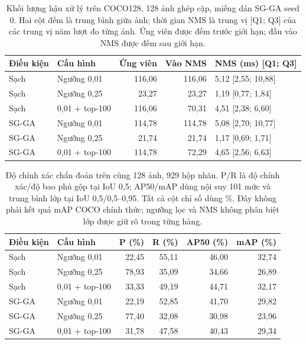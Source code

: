 \documentclass[a4paper,fleqn]{cas-dc}
\begin{document}
\begin{table}[t]
\centering
\small
\caption{Khối lượng hậu xử lý trên COCO128, 128 ảnh ghép cặp, miếng dán SG-GA seed 0. Hai cột đếm là trung bình giữa ảnh; thời gian NMS là trung vị [Q1; Q3] của các trung vị năm lượt đo từng ảnh. Ứng viên được đếm trước giới hạn; đầu vào NMS được đếm sau giới hạn.}
\begin{tabularx}{\textwidth}{XXrrX}
\toprule
Điều kiện & Cấu hình & Ứng viên & Vào NMS & NMS (ms) [Q1; Q3] \\
\midrule
Sạch & Ngưỡng 0,01 & 116,06 & 116,06 & 5,12 [2,55; 10,88] \\
Sạch & Ngưỡng 0,25 & 23,27 & 23,27 & 1,19 [0,77; 1,84] \\
Sạch & 0,01 + top-100 & 116,06 & 70,31 & 4,51 [2,38; 6,60] \\
SG-GA & Ngưỡng 0,01 & 114,78 & 114,78 & 5,08 [2,70; 10,77] \\
SG-GA & Ngưỡng 0,25 & 21,74 & 21,74 & 1,17 [0,69; 1,71] \\
SG-GA & 0,01 + top-100 & 114,78 & 72,29 & 4,65 [2,56; 6,63] \\
\bottomrule
\end{tabularx}
\label{tab:coco_latency}
\end{table}

\begin{table}[t]
\centering
\small
\caption{Độ chính xác chẩn đoán trên cùng 128 ảnh, 929 hộp nhãn. P/R là độ chính xác/độ bao phủ gộp tại IoU 0,5; AP50/mAP dùng nội suy 101 mức và trung bình lớp tại IoU 0,5/0,5--0,95. Tất cả cột chỉ số dùng \%. Đây không phải kết quả mAP COCO chính thức; ngưỡng lọc và NMS không phân biệt lớp được giữ rõ trong từng hàng.}
\begin{tabularx}{\textwidth}{XXrrrr}
\toprule
Điều kiện & Cấu hình & P (\%) & R (\%) & AP50 (\%) & mAP (\%) \\
\midrule
Sạch & Ngưỡng 0,01 & 22,45 & 55,11 & 46,00 & 32,74 \\
Sạch & Ngưỡng 0,25 & 78,93 & 35,09 & 34,66 & 26,89 \\
Sạch & 0,01 + top-100 & 33,33 & 49,19 & 44,71 & 32,17 \\
SG-GA & Ngưỡng 0,01 & 22,19 & 52,85 & 41,70 & 29,82 \\
SG-GA & Ngưỡng 0,25 & 77,40 & 32,08 & 30,98 & 23,96 \\
SG-GA & 0,01 + top-100 & 31,78 & 47,58 & 40,43 & 29,34 \\
\bottomrule
\end{tabularx}
\label{tab:coco_accuracy}
\end{table}
\end{document}
